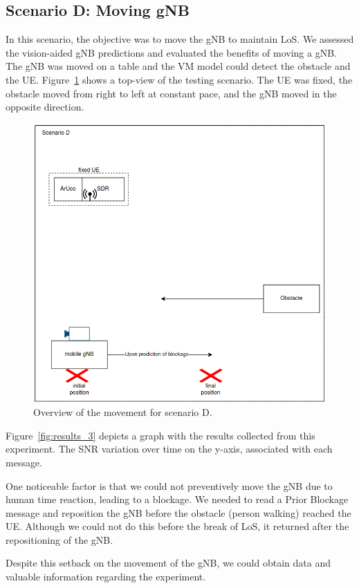 \subsection{Scenario D: Moving gNB}\label{subsec:scenario-3:-moving-gnb}

In this scenario, the objective was to move the gNB to maintain LoS\@.
We assessed the vision-aided gNB predictions and evaluated the benefits of moving a gNB\@.
The gNB was moved on a table and the VM model could detect the obstacle and the UE\@.
Figure~\ref{fig:test_movgnb} shows a top-view of the testing scenario.
The UE was fixed, the obstacle moved from right to left at constant pace, and the gNB moved in the opposite direction.

\begin{figure}[H]
    \centering
    \includegraphics[width=0.5\linewidth]{figures/scenario3}
    \caption{Overview of the movement for scenario D.}
    \label{fig:test_movgnb}
\end{figure}

Figure~\ref{fig:results_3} depicts a graph with the results collected from this experiment.
The SNR variation over time on the y-axis, associated with each message.

One noticeable factor is that we could not preventively move the gNB due to human time reaction, leading to a blockage.
We needed to read a Prior Blockage message and reposition the gNB before the obstacle (person walking) reached the UE\@.
Although we could not do this before the break of LoS, it returned after the repositioning of the gNB\@.

Despite this setback on the movement of the gNB, we could obtain data and valuable information regarding the experiment.

